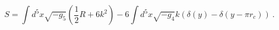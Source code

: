 \begin{equation} \label{lagrs}
	S=\int d^5 x \sqrt{-g_5} (\frac{1}{2}R + 6 k^2)-  6 \int d^5 x\sqrt{-g_4}k  (\delta(y) - \delta(y-\pi r_c))\ .
       \end{equation}

